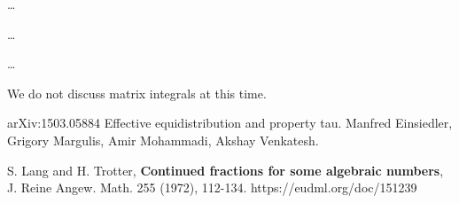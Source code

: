 \documentclass[12pt]{article}
\begin{document}
{\noindent \dots \newline

\noindent \dots \newline

\noindent \dots \newline

\noindent We do not discuss matrix integrals at this time.

\begin{thebibliography}{9}

 arXiv:1503.05884 Effective equidistribution and property tau. Manfred Einsiedler, Grigory Margulis, Amir Mohammadi, Akshay Venkatesh.

 S. Lang and H. Trotter, \textbf{Continued fractions for some algebraic numbers}, J. Reine Angew. Math. 255 (1972), 112-134. https://eudml.org/doc/151239

\end{thebibliography}



}
\end{document}
